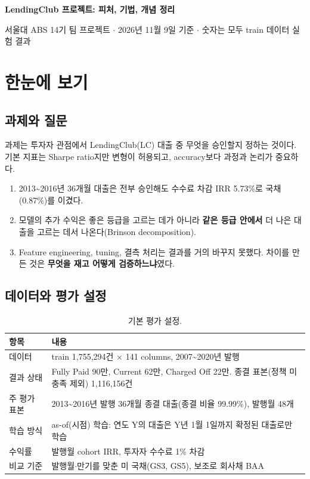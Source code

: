 \documentclass[11pt]{report}
\begin{document}
\begin{center}
{\LARGE\bfseries LendingClub 프로젝트: 피처, 기법, 개념 정리}\par\medskip
{\small 서울대 ABS 14기 팀 프로젝트 \ensuremath{\cdot} 2026년 11월 9일 기준 \ensuremath{\cdot} 숫자는 모두 train 데이터 실험 결과}
\end{center}
\tableofcontents

\chapter{한눈에 보기}

\section{과제와 질문}
과제는 투자자 관점에서 LendingClub(LC) 대출 중 무엇을 승인할지 정하는 것이다. 기본 지표는 Sharpe ratio지만 변형이 허용되고, accuracy보다 과정과 논리가 중요하다.

\begin{keybox}[이 문서의 결론 세 줄]
\begin{enumerate}
\item 2013\textasciitilde 2016년 36개월 대출은 전부 승인해도 수수료 차감 IRR 5.73\%로 국채(0.87\%)를 이겼다.
\item 모델의 추가 수익은 좋은 등급을 고르는 데가 아니라 \textbf{같은 등급 안에서} 더 나은 대출을 고르는 데서 나온다(Brinson decomposition).
\item Feature engineering, tuning, 결측 처리는 결과를 거의 바꾸지 못했다. 차이를 만든 것은 \textbf{무엇을 재고 어떻게 검증하느냐}였다.
\end{enumerate}
\end{keybox}

\section{데이터와 평가 설정}
\begin{table}[H]\centering\small
\begin{tabularx}{\linewidth}{@{}lL@{}}\toprule
항목 & 내용\\\midrule
데이터 & train 1,755,294건 \ensuremath{\times} 141 columns, 2007\textasciitilde 2020년 발행\\
결과 상태 & Fully Paid 90만, Current 62만, Charged Off 22만. 종결 표본(정책 미충족 제외) 1,116,156건\\
주 평가 표본 & 2013\textasciitilde 2016년 발행 36개월 종결 대출(종결 비율 99.99\%), 발행월 48개\\
학습 방식 & as-of(시점) 학습: 연도 Y의 대출은 Y년 1월 1일까지 확정된 대출로만 학습\\
수익률 & 발행월 cohort IRR, 투자자 수수료 1\% 차감\\
비교 기준 & 발행월\ensuremath{\cdot}만기를 맞춘 미 국채(GS3, GS5), 보조로 회사채 BAA\\\bottomrule
\end{tabularx}
\caption{기본 평가 설정.}
\end{table}
\end{document}
